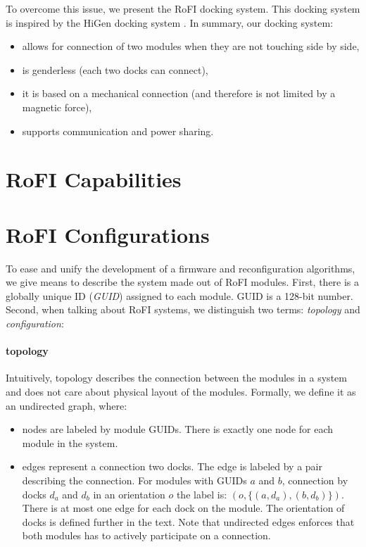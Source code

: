 To overcome this issue, we present the RoFI docking system. This docking system
is inspired by the HiGen docking system \cite{parrott_higen:_2014}. In summary,
our docking system:
\begin{itemize}
    \item allows for connection of two modules when they are not touching side
    by side,
    \item is genderless (each two docks can connect),
    \item it is based on a mechanical connection (and therefore is not limited
    by a magnetic force),
    \item supports communication and power sharing.
\end{itemize}




\section{RoFI Capabilities}\label{sec:capabilities}

\section{RoFI Configurations} \label{sec:configuration}

To ease and unify the development of a firmware and reconfiguration algorithms,
we give means to describe the system made out of RoFI modules. First, there is
a globally unique ID (\emph{GUID}) assigned to each module. GUID is a 128-bit
number. Second, when talking about RoFI systems, we distinguish two terms:
\emph{topology} and \emph{configuration}:

\paragraph{topology} Intuitively, topology describes the connection between the
modules in a system and does not care about physical layout of the modules.
Formally, we define it as an undirected graph, where:
\begin{itemize}
    \item nodes are labeled by module GUIDs. There is exactly one node for each
    module in the system.
    \item edges represent a connection two docks. The edge is labeled by a pair
    describing the connection. For modules with GUIDs $a$ and $b$, connection by
    docks $d_a$ and $d_b$ in an orientation $o$ the label is: $(o, \{(a, d_a),
    (b, d_b)\})$. There is at most one edge for each dock on the module. The
    orientation of docks is defined further in the text. Note that undirected
    edges enforces that both modules has to actively participate on a
    connection.
\end{itemize}


